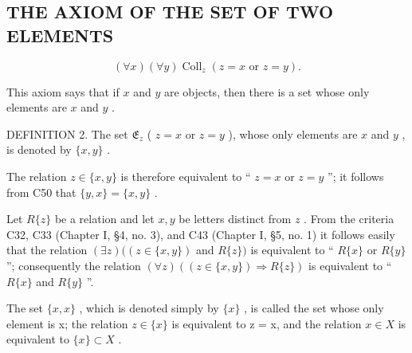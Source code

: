 \subsection{THE AXIOM OF THE SET OF TWO ELEMENTS}

\[
(\forall x) (\forall y) \operatorname{Coll} _ {z} (z = x \text {   or   } z = y).
\]

This axiom says that if \(x\) and \(y\) are objects, then there is a set whose only elements are \(x\) and \(y\) .

DEFINITION 2. The set \(\mathfrak{E}_z\) ( \(z = x\) or \(z = y\) ), whose only elements are \(x\) and \(y\) , is denoted by \(\{x, y\}\) .

The relation \(z \in \{x, y\}\) is therefore equivalent to `` \(z = x\) or \(z = y\) ''; it follows from C50 that \(\{y, x\} = \{x, y\}\) .

Let \(R\{z\}\) be a relation and let \(x, y\) be letters distinct from \(z\) . From the criteria C32, C33 (Chapter I, §4, no. 3), and C43 (Chapter I, §5, no. 1) it follows easily that the relation \((\exists z)((z \in \{x, y\})\) and \(R\{z\})\) is equivalent to `` \(R\{x\}\) or \(R\{y\}\) ''; consequently the relation \((\forall z)((z \in \{x, y\}) \Longrightarrow R\{z\})\) is equivalent to `` \(R\{x\}\) and \(R\{y\}\) ''.

The set \(\{x, x\}\) , which is denoted simply by \(\{x\}\) , is called the set whose only element is x; the relation \(z \in \{x\}\) is equivalent to z = x, and the relation \(x \in X\) is equivalent to \(\{x\} \subset X\) .

